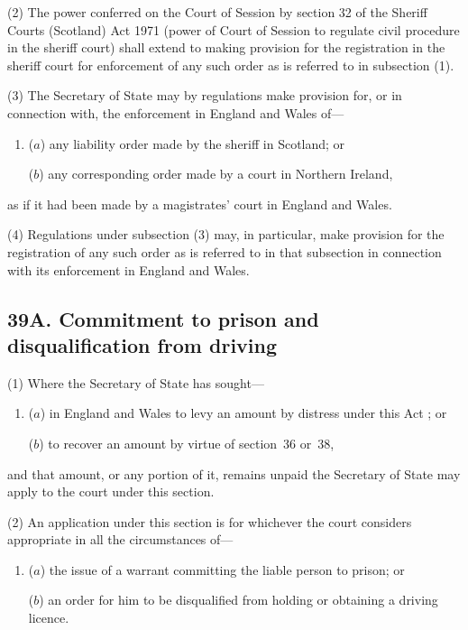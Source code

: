 \documentclass[12pt,a4paper]{article}
\begin{document}
(2) The power conferred on the Court of Session by section 32 of the Sheriff Courts (Scotland) Act 1971 (power of Court of Session to regulate civil procedure in the sheriff court) shall extend to making provision for the registration in the sheriff court for enforcement of any such order as is referred to in subsection (1).

(3) The Secretary of State may by regulations make provision for, or in connection with, the enforcement in England and Wales of—
\begin{enumerate}\item[]
($a$) any liability order made by the sheriff in Scotland; or

($b$) any corresponding order made by a court in Northern Ireland,
\end{enumerate}
as if it had been made by a magistrates' court in England and Wales.

(4) Regulations under subsection (3)  may, in particular, make provision for the registration of any such order as is referred to in that subsection in connection with its enforcement in England and Wales.


\subsection[39A. Commitment to prison and disqualification from driving]{\sloppy 39A. Commitment to prison and disqualification from driving}

(1) Where the 
Secretary of State  %
has sought—
\begin{enumerate}\item[]
($a$) in England and Wales to 
levy an amount by distress under this Act%
; or

($b$) to recover an amount by virtue of section~36 or~38,
\end{enumerate}
and that amount, or any portion of it, remains unpaid 
the Secretary of State  %
may apply to the court under this section.

(2) An application under this section is for whichever the court considers appropriate in all the circumstances of—
\begin{enumerate}\item[]
($a$) the issue of a warrant committing the liable person to prison; or

($b$) an order for him to be disqualified from holding or obtaining a driving licence.
\end{enumerate}
\end{document}
